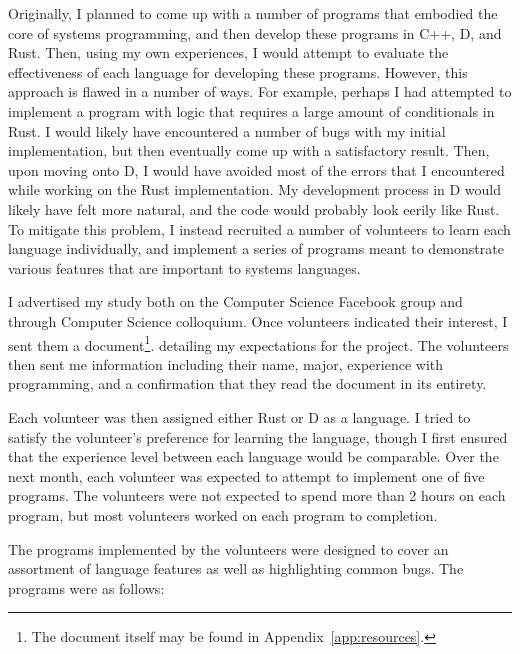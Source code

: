 \documentclass[draftcopy,nolof,nolot]{srpaper}
\begin{document}
Originally, I planned to come up with a number of programs that embodied the
core of systems programming, and then develop these programs in C++, D, and
Rust. Then, using my own experiences, I would attempt to evaluate the
effectiveness of each language for developing these programs. However, this
approach is flawed in a number of ways. For example, perhaps I had attempted to
implement a program with logic that requires a large amount of conditionals in
Rust. I would likely have encountered a number of bugs with my initial
implementation, but then eventually come up with a satisfactory result. Then,
upon moving onto D, I would have avoided most of the errors that I encountered
while working on the Rust implementation. My development process in D would
likely have felt more natural, and the code would probably look eerily like
Rust. To mitigate this problem, I instead recruited a number of volunteers to
learn each language individually, and implement a series of programs meant to
demonstrate various features that are important to systems languages.

I advertised my study both on the Computer Science Facebook group and through
Computer Science colloquium. Once volunteers indicated their interest, I sent
them a document\footnote{The document itself may be found in
Appendix~\ref{app:resources}.}. detailing my expectations for the project. The
volunteers then sent me information including their name, major, experience
with programming, and a confirmation that they read the document in its
entirety.

Each volunteer was then assigned either Rust or D as a language. I tried to
satisfy the volunteer's preference for learning the language, though I first
ensured that the experience level between each language would be comparable.
Over the next month, each volunteer was expected to attempt to implement one
of five programs. The volunteers were not expected to spend more than 2 hours
on each program, but most volunteers worked on each program to completion.

The programs implemented by the volunteers were designed to cover an
assortment of language features as well as highlighting common bugs. The
programs were as follows:
\end{document}
